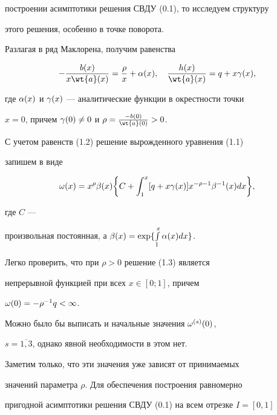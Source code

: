 построении асимптотики решения СВДУ (0.1), то исследуем структуру


этого решения, особенно в точке поворота.





Разлагая в ряд Маклорена, получим равенства


\begin{equation}


- \frac{b(x)}{x \wt{a} (x)} = \frac{\rho}{x} + \aa (x), \quad


\frac{h(x)}{\wt{a} (x)} = q + x \g (x),


\end{equation}


где $\aa(x)$ и $\g (x)$ --- аналитические функции в окрестности точки


$x=0$, причем $\g (0) \neq 0$ и $\rho = \frac{-b (0)}{\wt{a}(0)}> 0$.


С учетом равенств (1.2) решение вырожденного уравнения (1.1)


запишем в виде


\begin{equation}


\o (x) = x^{\rho} \beta (x) \bigg\{ C + \int _1^x [ q + x \g (x)


] x^{-\rho -1} \beta^{-1} (x) d x \bigg\}, 


\end{equation}


где $C$ ---


произвольная постоянная, а $\beta (x) = \exp \{ \int \limits_1^x


\aa (x) d x \}$.





Легко проверить, что при $\rho > 0$ решение (1.3) является


непрерывной функцией при всех $x \in [0; 1]$, причем


$\o (0) =-\rho^{-1} q < \infty$.





Можно было бы выписать и начальные значения $\o^{(s)} (0)$,


$s=\overline{1, 3}$, однако явной необходимости в этом нет.


Заметим только, что эти значения уже зависят от принимаемых


значений параметра $\rho$. Для обеспечения построения равномерно


пригодной асимптотики решения СВДУ (0.1) на всем отрезке $I =[0,1]$


